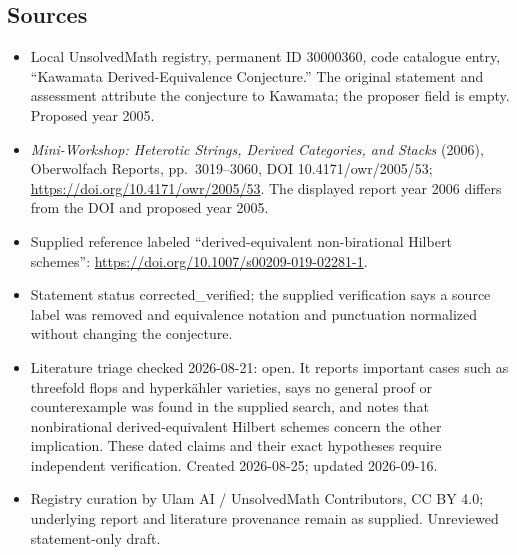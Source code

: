 \documentclass[11pt]{article}
\begin{document}
\subsection{Sources}
\begin{itemize}
\item Local UnsolvedMath registry, permanent ID 30000360, code catalogue entry, ``Kawamata Derived-Equivalence Conjecture.'' The original statement and assessment attribute the conjecture to Kawamata; the proposer field is empty. Proposed year 2005.
\item \emph{Mini-Workshop: Heterotic Strings, Derived Categories, and Stacks} (2006), Oberwolfach Reports, pp.\ 3019--3060, DOI 10.4171/owr/2005/53; \url{https://doi.org/10.4171/owr/2005/53}. The displayed report year 2006 differs from the DOI and proposed year 2005.
\item Supplied reference labeled ``derived-equivalent non-birational Hilbert schemes'': \url{https://doi.org/10.1007/s00209-019-02281-1}.
\item Statement status corrected\_verified; the supplied verification says a source label was removed and equivalence notation and punctuation normalized without changing the conjecture.
\item Literature triage checked 2026-08-21: open. It reports important cases such as threefold flops and hyperk\"ahler varieties, says no general proof or counterexample was found in the supplied search, and notes that nonbirational derived-equivalent Hilbert schemes concern the other implication. These dated claims and their exact hypotheses require independent verification. Created 2026-08-25; updated 2026-09-16.
\item Registry curation by Ulam AI / UnsolvedMath Contributors, CC BY 4.0; underlying report and literature provenance remain as supplied. Unreviewed statement-only draft.
\end{itemize}
\end{document}
